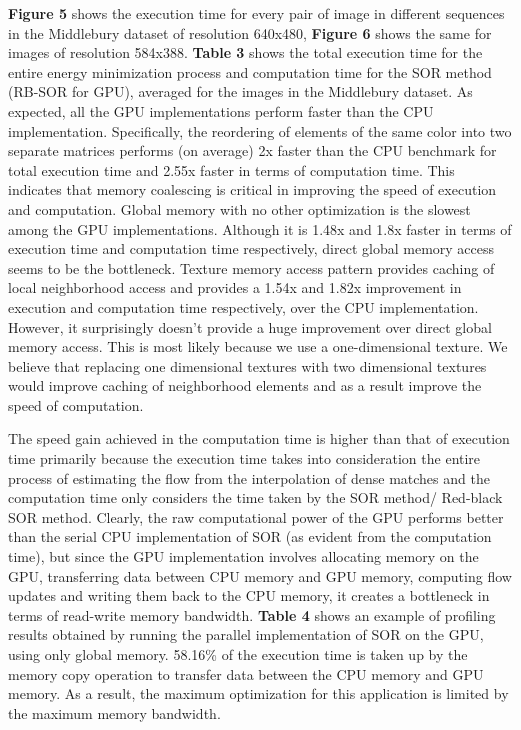 \documentclass[english]{article}
\newcommand{\csvautotabularcenter}[2][]{\csvloop{autotabularcenter={#2},#1}}
\begin{document}
	\textbf{Figure 5} shows the execution time for every pair of image in different sequences in the Middlebury dataset of resolution 640x480, \textbf{Figure 6} shows the same for images of resolution 584x388. \textbf{Table 3} shows the total execution time for the entire energy minimization process and computation time for the SOR method (RB-SOR for GPU), averaged for the images in the Middlebury dataset. As expected, all the GPU implementations perform faster than the CPU implementation. Specifically, the reordering of elements of the same color into two separate matrices performs (on average) 2x faster than the CPU benchmark for total execution time and 2.55x faster in terms of computation time. This indicates that memory coalescing is critical in improving the speed of execution and computation. Global memory with no other optimization is the slowest among the GPU implementations. Although it is 1.48x and 1.8x faster in terms of execution time and computation time respectively, direct global memory access seems to be the bottleneck. Texture memory access pattern provides caching of local neighborhood access and provides a 1.54x and 1.82x improvement in execution and computation time respectively, over the CPU implementation. However, it surprisingly doesn’t provide a huge improvement over direct global memory access. This is most likely because we use a one-dimensional texture. We believe that replacing one dimensional textures with two dimensional textures would improve caching of neighborhood elements and as a result improve the speed of computation.

	\begin{center}
	\csvautotabularcenter{results/tables/3_compute_time.csv}	
	\end{center}

	The speed gain achieved in the computation time is  higher than that of execution time primarily because the execution time takes into consideration the entire process of estimating the flow from the interpolation of dense matches and the computation time only considers the time taken by the SOR method/ Red-black SOR method. Clearly, the raw computational power of the GPU performs better than the serial CPU implementation of SOR (as evident from the computation time), but since the GPU implementation involves allocating memory on the GPU, transferring data between CPU memory and GPU memory, computing flow updates and writing them back to the CPU memory, it creates a bottleneck in terms of read-write memory bandwidth. \textbf{Table 4} shows an example of profiling results obtained by running the parallel implementation of SOR on the GPU, using only global memory. 58.16\% of the execution time is taken up by the memory copy operation to transfer data between the CPU memory and GPU memory. As a result, the maximum optimization for this application is limited by the maximum memory bandwidth.
\end{document}
